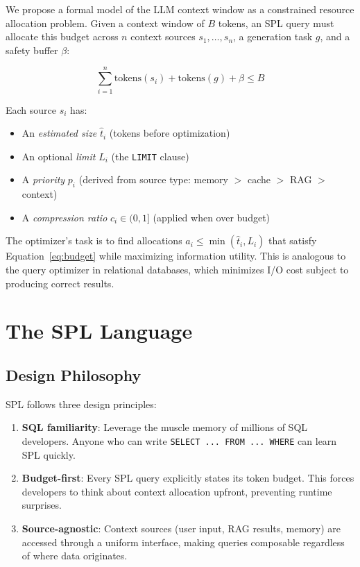 \documentclass[11pt,a4paper]{article}
\begin{document}
We propose a formal model of the LLM context window as a constrained resource allocation problem. Given a context window of $B$ tokens, an SPL query must allocate this budget across $n$ context sources $s_1, \ldots, s_n$, a generation task $g$, and a safety buffer $\beta$:

\begin{equation}
\label{eq:budget}
\sum_{i=1}^{n} \text{tokens}(s_i) + \text{tokens}(g) + \beta \leq B
\end{equation}

Each source $s_i$ has:
\begin{itemize}[nosep]
  \item An \emph{estimated size} $\hat{t}_i$ (tokens before optimization)
  \item An optional \emph{limit} $L_i$ (the \texttt{LIMIT} clause)
  \item A \emph{priority} $p_i$ (derived from source type: memory $>$ cache $>$ RAG $>$ context)
  \item A \emph{compression ratio} $c_i \in (0, 1]$ (applied when over budget)
\end{itemize}

The optimizer's task is to find allocations $a_i \leq \min(\hat{t}_i, L_i)$ that satisfy Equation~\ref{eq:budget} while maximizing information utility. This is analogous to the query optimizer in relational databases, which minimizes I/O cost subject to producing correct results.

\section{The SPL Language}
\label{sec:language}

\subsection{Design Philosophy}

SPL follows three design principles:

\begin{enumerate}[nosep]
  \item \textbf{SQL familiarity}: Leverage the muscle memory of millions of SQL developers. Anyone who can write \texttt{SELECT ... FROM ... WHERE} can learn SPL quickly.
  \item \textbf{Budget-first}: Every SPL query explicitly states its token budget. This forces developers to think about context allocation upfront, preventing runtime surprises.
  \item \textbf{Source-agnostic}: Context sources (user input, RAG results, memory) are accessed through a uniform interface, making queries composable regardless of where data originates.
\end{enumerate}
\end{document}
